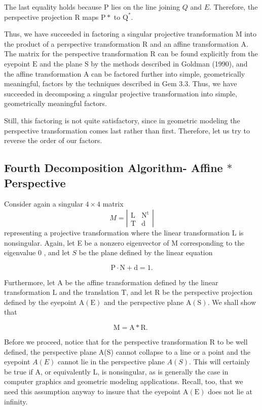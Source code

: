 The last equality holds because $\mathrm{P}$ lies on the line joining $Q$ and $E$. Therefore, the perspective projection $\mathrm{R}$ maps $\mathrm{P} *$ to $\mathrm{Q}^{*}$.

Thus, we have succeeded in factoring a singular projective transformation $\mathrm{M}$ into the product of a perspective transformation $\mathrm{R}$ and an affine transformation A. The matrix for the perspective transformation $\mathrm{R}$ can be found explicitly from the eyepoint $\mathrm{E}$ and the plane $\mathrm{S}$ by the methods described in Goldman (1990), and the affine transformation A can be factored further into simple, geometrically meaningful, factors by the techniques described in Gem 3.3. Thus, we have succeeded in decomposing a singular projective transformation into simple, geometrically meaningful factors.

Still, this factoring is not quite satisfactory, since in geometric modeling the perspective transformation comes last rather than first. Therefore, let us try to reverse the order of our factors.

\subsection*{Fourth Decomposition Algorithm- Affine $*$ Perspective}
Consider again a singular $4 \times 4$ matrix
$$
M=\left|\begin{array}{cc}
\mathrm{L} & \mathrm{N}^{\mathrm{t}} \\
\mathrm{T} & \mathrm{d}
\end{array}\right|
$$
representing a projective transformation where the linear transformation $\mathrm{L}$ is nonsingular. Again, let E be a nonzero eigenvector of M corresponding to the eigenvalue 0 , and let $S$ be the plane defined by the linear equation

$$
\mathrm{P} \cdot \mathrm{N}+\mathrm{d}=1 .
$$

Furthermore, let A be the affine transformation defined by the linear transformation $\mathrm{L}$ and the translation $\mathrm{T}$, and let $\mathrm{R}$ be the perspective projection defined by the eyepoint $\mathrm{A}(\mathrm{E})$ and the perspective plane $\mathrm{A}(\mathrm{S})$. We shall show that

$$
\mathrm{M}=\mathrm{A} * \mathrm{R} \text {. }
$$

Before we proceed, notice that for the perspective transformation $\mathrm{R}$ to be well defined, the perspective plane A(S) cannot collapse to a line or a point and the eyepoint $A(E)$ cannot lie in the perspective plane $A(S)$. This will certainly be true if A, or equivalently L, is nonsingular, as is generally the case in computer graphics and geometric modeling applications. Recall, too, that we need this assumption anyway to insure that the eyepoint $\mathrm{A}(\mathrm{E})$ does not lie at infinity.

